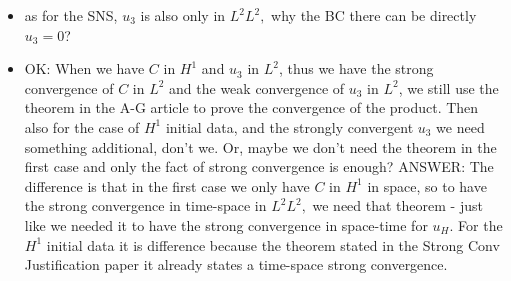 \documentclass[11pt]{article}
\begin{document}
\begin{itemize}
\item as for the SNS, $u_3$ is also only in $L^2 L^2,$ why the BC there can be directly $u_3 = 0$?

\item OK: When we have $C$ in $H^1$ and $u_3$ in $L^2$, thus we have the strong convergence of $C$ in $L^2$ and the weak convergence of $u_3$ in $L^2$, we still use the theorem in the A-G article to prove the convergence of the product. Then also for the case of $H^1$ initial data, and the strongly convergent $u_3$ we need something additional, don't we. Or, maybe we don't need the theorem in the first case and only the fact of strong convergence is enough? ANSWER: The difference is that in the first case we only have $C$ in $H^1$ in space, so to have the strong convergence in time-space in $L^2 L^2,$ we need that theorem - just like we needed it to have the strong convergence in space-time for $u_H.$ For the $H^1$ initial data it is difference because the theorem stated in the Strong Conv Justification paper it already states a time-space strong convergence.

\end{itemize}
\end{document}
